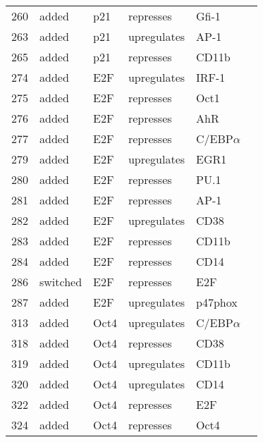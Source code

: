 \begin{center}
\begin{scriptsize}
\begin{supertabular}{|p{2 cm}|p{2cm}|p{3cm}|p{2.5cm}|p{2cm}|p{1.5cm}|}
260 &  added & p21  & represses &  Gfi-1 & \\
263 &  added & p21  & upregulates &  AP-1 & \\
265 &  added & p21  & represses &  CD11b & \\
274 &  added & E2F  & upregulates &  IRF-1 & \\
275 &  added & E2F  & represses &  Oct1 & \\
276 &  added & E2F  & represses &  AhR & \\
277 &  added & E2F  & represses &  C/EBP$\alpha$ &\cite{Zaragoza2010} \\
279 &  added & E2F  & upregulates &  EGR1 & \\
280 &  added & E2F  & represses &  PU.1 & \\
281 &  added & E2F  & represses &  AP-1 & \\
282 &  added & E2F  & upregulates &  CD38 & \\
283 &  added & E2F  & represses &  CD11b & \\
284 &  added & E2F  & represses &  CD14 & \\
286 &  switched &  E2F  & represses &  E2F & \\
287 &  added & E2F  & upregulates &  p47phox & \\
313 &  added & Oct4  & upregulates &  C/EBP$\alpha$ & \\
318 &  added & Oct4  & represses &  CD38 & \\
319 &  added & Oct4  & upregulates &  CD11b & \\
320 &  added & Oct4  & upregulates &  CD14 & \\
322 &  added & Oct4  & represses &  E2F & \\
324 &  added & Oct4  & represses &  Oct4 & \\

\hline
\end{supertabular}
\end{scriptsize}
\end{center}
%







